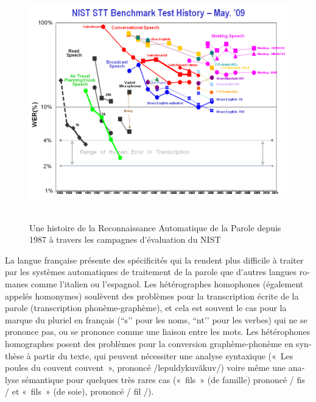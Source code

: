 \documentclass[]{../metanetpaper}
\begin{document}
\begin{french}
\begin{multicols}{2}
\begin{figure}[!ht]
\begin{center}
  \includegraphics[height=4.0in]{../_media/french/french_pix8_speech_reco_nist.png}
  \caption{Une histoire de la Reconnaissance Automatique de la Parole depuis 1987 à travers les campagnes d{\mbox '}évaluation du NIST~\cite{speechreconist}}
  \label{fig:nistreco}
\end{center}
\end{figure}

La langue française présente des spécificités qui la rendent plus
difficile à traiter par les systèmes automatiques de traitement de la
parole que d{\mbox '}autres langues romanes comme l{\mbox '}italien ou l{\mbox '}espagnol. Les
hétérographes homophones (également appelés homonymes) soulèvent des
problèmes pour la transcription écrite de la parole (transcription
phonème-graphème), et cela est souvent le cas pour la marque du
pluriel en français (``s{\mbox '}{\mbox '} pour les noms, ``nt{\mbox '}{\mbox '} pour les verbes) qui
ne se prononce pas, ou se prononce comme une liaison entre les
mots. Les hétérophones homographes posent des problèmes pour la
conversion graphème-phonème en synthèse à partir du texte, qui peuvent
nécessiter une analyse syntaxique («~Les poules du couvent couvent~»,
prononcé /lepuldykuvãkuv/) voire même une analyse sémantique pour
quelques très rares cas («~fils~» (de famille) prononcé / fis / et
«~fils~» (de soie), prononcé / fil /).


\end{multicols}
\end{french}
\end{document}
